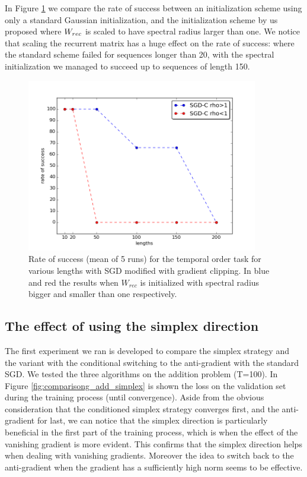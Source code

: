 In Figure \ref{fig:temporal_rates} we compare the rate of success between an initialization scheme using only a standard Gaussian initialization, and the initialization scheme by us proposed where $W_{rec}$ is scaled to have spectral radius larger than one. We notice that scaling the recurrent matrix has a huge effect on the rate of success: where the standard scheme failed for sequences longer than 20, with the spectral initialization we managed to succeed up to sequences of length 150.

\begin{figure}
	\centering
	\includegraphics[width= 0.9\textwidth]{chapter4/temporal_rates.png}
	\caption{Rate of success (mean of 5 runs) for the temporal order task for various lengths with SGD modified with gradient clipping. In blue and red the results when $W_{rec}$ is initialized with spectral radius bigger and smaller than one respectively.}
	\label{fig:temporal_rates}
\end{figure}



\subsection{The effect of using the simplex direction}
The first experiment we ran is developed to compare the simplex strategy and the variant with the conditional switching to the anti-gradient with the standard SGD. We tested the three algorithms on the addition problem (T=100). In Figure \ref{fig:comparisong_add_simplex} is shown the loss on the validation set during the training process (until convergence). Aside from the obvious consideration that the conditioned simplex strategy converges first, and the anti-gradient for last, we can notice that the simplex direction is particularly beneficial in the first part of the training process, which is when the effect of the vanishing gradient is more evident. This confirms that the simplex direction helps when dealing with vanishing gradients. Moreover the idea to switch back to the anti-gradient when the gradient has a sufficiently high norm seems to be effective.

